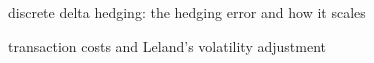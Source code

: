 \begin{planned}
  \item discrete delta hedging: the hedging error and how it scales
  \item transaction costs and Leland's volatility adjustment
\end{planned}
